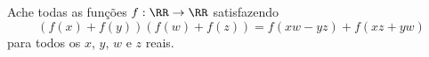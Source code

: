 Ache todas as funções $f: \RR \to \RR$ satisfazendo
$$ (f(x) + f(y))(f(w) + f(z)) = f(xw - yz) + f(xz + yw) $$
para todos os $x$, $y$, $w$ e $z$ reais.
